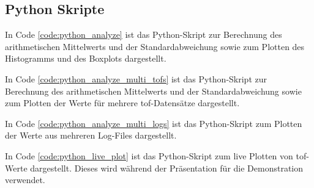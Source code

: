 \subsection{Python Skripte}\label{sec:python_scripts}

In Code \ref{code:python_analyze} ist das Python-Skript zur Berechnung des arithmetischen Mittelwerts und der
Standardabweichung sowie zum Plotten des Histogramms und des Boxplots dargestellt.



In Code \ref{code:python_analyze_multi_tofs} ist das Python-Skript zur Berechnung des arithmetischen Mittelwerts und der
Standardabweichung sowie zum Plotten der Werte für mehrere \acrshort{tof}-Datensätze dargestellt.



In Code \ref{code:python_analyze_multi_logs} ist das Python-Skript zum Plotten der Werte aus mehreren Log-Files
dargestellt.



In Code \ref{code:python_live_plot} ist das Python-Skript zum live Plotten von \acrshort{tof}-Werte dargestellt. Dieses
wird während der Präsentation für die Demonstration verwendet.



\pagebreak

